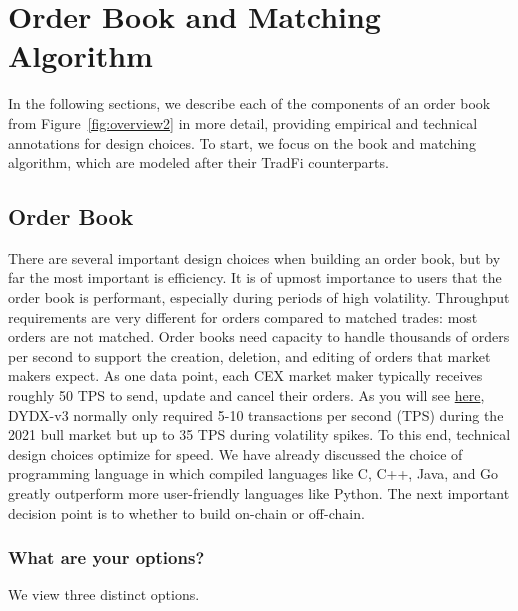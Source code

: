 \documentclass{article}
\begin{document}
\section{Order Book and Matching Algorithm}

In the following sections, we describe each of the components of an order book from Figure~\ref{fig:overview2} in more detail, providing empirical and technical annotations for design choices. To start, we focus on the book and matching algorithm, which are modeled after their TradFi counterparts.

\subsection{Order Book}

\noindent There are several important design choices when building an order book, but by far the most important is efficiency. It is of upmost importance to users that the order book is performant, especially during periods of high volatility.
Throughput requirements are very different for orders compared to matched trades: most orders are not matched. 
Order books need capacity to handle thousands of orders per second to support the creation, deletion, and editing of orders that market makers expect.
As one data point, each CEX market maker typically receives roughly 50 TPS to send, update and cancel their orders. As you will see \href{https://twitter.com/EliBenSasson/status/1458813552446345226/photo/1}{here}, DYDX-v3 normally only required 5-10 transactions per second (TPS) during the 2021 bull market but up to 35 TPS during volatility spikes. 
To this end, technical design choices optimize for speed. We have already discussed the choice of programming language in which compiled languages like C, C++, Java, and Go greatly outperform more user-friendly languages like Python. 
The next important decision point is to whether to build on-chain or off-chain.

\subsubsection{What are your options?}

We view three distinct options.
\end{document}
